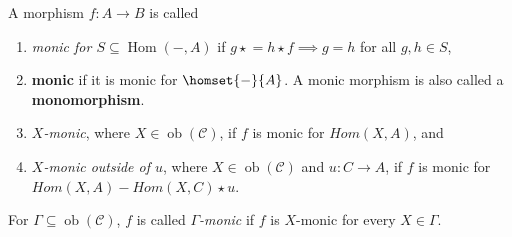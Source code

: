 \begin{definition}
    A morphism $f : A \mathop{\to} B$ is called 
    \begin{enumerate}[label=(\roman*)] 
        \item 
            \emph{monic for $S \mathop{\subseteq} \operatorname{Hom}(-,A)$} 
            if $g \mathop{\star} \mathop{=} h \mathop{\star} f \implies g \mathop{=} h$ for all $g,h \mathop{\in} S$,
        \item \textbf{monic} if it is monic for $\homset{-}{A}$. A monic morphism is also called a \textbf{monomorphism}.
        \item 
            \emph{$X$-monic}, where $X \mathop{\in} \operatorname{ob}(\mathcal{C})$, if $f$ is monic for $Hom(X,A)$, and
        \item 
            \emph{$X$-monic outside of $u$}, where $X \mathop{\in} \operatorname{ob}(\mathcal{C})$ and $u : C \mathop{\to} A$, if $f$ is monic for $Hom(X,A) -  Hom(X,C) \mathop{\star} u$.
    \end{enumerate}
    For $\Gamma \mathop{\subseteq} \operatorname{ob}(\mathcal{C})$, $f$ is called \emph{$\Gamma$-monic} if $f$ is $X$-monic for every $X \mathop{\in} \Gamma$.
\end{definition}